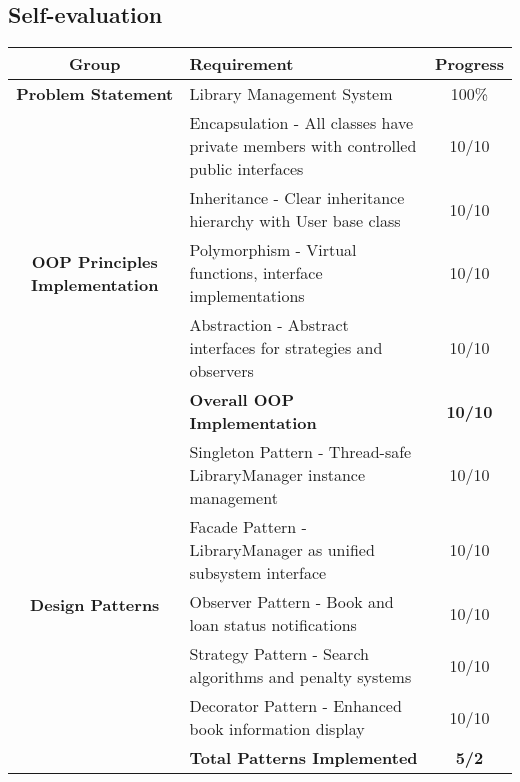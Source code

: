 \subsection*{Self-evaluation}
\begin{center}
	\begin{table}[H]
		\renewcommand{\arraystretch}{1.5}
		\setlength{\tabcolsep}{8pt}

		\begin{tabularx}{\textwidth}{| c | X | c |}
			\hline
			\rowcolor{gray!30}
			\textbf{Group} & \textbf{Requirement}                                                               & \textbf{Progress} \\
			\hline

			\textbf{Problem Statement}
			               & Library Management System                                                          & 100\%             \\
			\hline

			\multirow{5}{*}{\parbox{4cm}{\centering\textbf{OOP Principles Implementation}}}
			               & Encapsulation - All classes have private members with controlled public interfaces & 10/10             \\
			\cline{2-3}
			               & Inheritance - Clear inheritance hierarchy with User base class                     & 10/10             \\
			\cline{2-3}
			               & Polymorphism - Virtual functions, interface implementations                        & 10/10             \\
			\cline{2-3}
			               & Abstraction - Abstract interfaces for strategies and observers                     & 10/10             \\
			\cline{2-3}
			               & \textbf{Overall OOP Implementation}                                                & \textbf{10/10}    \\
			\hline

			\multirow{7}{*}{\parbox{4cm}{\centering\textbf{Design Patterns}}}
			               & Singleton Pattern - Thread-safe LibraryManager instance management                 & 10/10             \\
			\cline{2-3}
			               & Facade Pattern - LibraryManager as unified subsystem interface                     & 10/10             \\
			\cline{2-3}
			               & Observer Pattern - Book and loan status notifications                              & 10/10             \\
			\cline{2-3}
			               & Strategy Pattern - Search algorithms and penalty systems                           & 10/10             \\
			\cline{2-3}
			               & Decorator Pattern - Enhanced book information display                              & 10/10             \\
			\cline{2-3}
			               & \textbf{Total Patterns Implemented}                                                & \textbf{5/2}      \\
			\hline


\end{tabularx}
\end{table}
\end{center}
